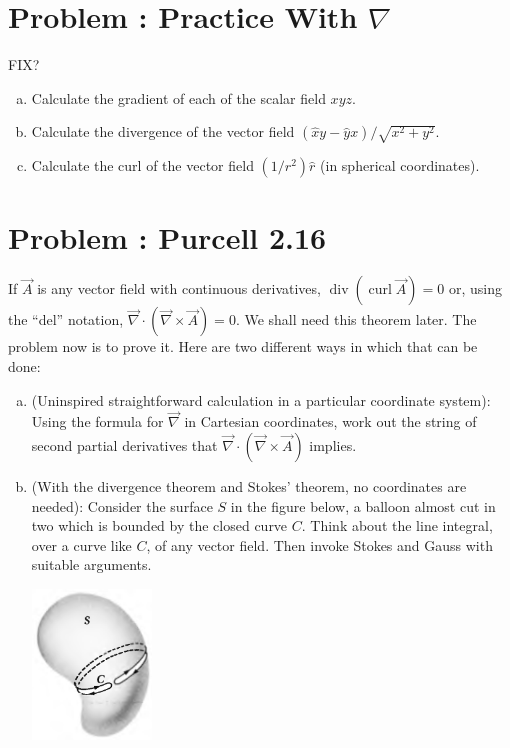 \documentclass[problems]{esg8022pset}
\date{\today }
\begin{document}
\section{Problem \thesection: Practice With $\nabla $}
FIX?
  \begin{enumerate}[(a)]
    \item Calculate the gradient of each of the scalar field $xyz$.
    \item Calculate the divergence of the vector field $(\hat{x} y - \hat{y} x) / \sqrt{x^2 + y^2}$.
    \item Calculate the curl of the vector field $(1/r^2)\hat{r}$ (in spherical coordinates).
  \end{enumerate}
\section{Problem \thesection: Purcell 2.16}
  If $\vec A$ is any vector field with continuous derivatives, $\operatorname{div}(\operatorname{curl}\vec A) = 0$ or, using the ``del'' notation, $\vec \nabla \cdot (\vec \nabla \times \vec A) = 0$. We shall need this theorem later. The problem now is to prove it. Here are two different ways in which that can be done:
  \begin{enumerate}[(a)]
    \item (Uninspired straightforward calculation in a particular coordinate system): Using the formula for $\vec\nabla$ in Cartesian coordinates, work out the string of second partial derivatives that $\vec \nabla \cdot (\vec \nabla \times \vec A)$ implies.
    \item (With the divergence theorem and Stokes' theorem, no coordinates are needed): Consider the surface $S$ in the figure below, a balloon almost cut in two which is bounded by the closed curve $C$. Think about the line integral, over a curve like $C$, of any vector field. Then invoke Stokes and Gauss with suitable arguments.
      \begin{center}\includegraphics[width=0.25\textwidth]{ps03_02}\end{center}
  \end{enumerate}
\end{document}
